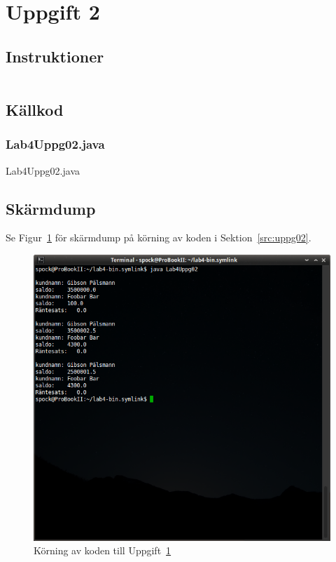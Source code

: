 \section{Uppgift 2}\label{sec:uppg02}

\subsection{Instruktioner}
\begin{Verbatim}[fontsize=\small]
% TODO: Lägg till instruktioner
\end{Verbatim}


\subsection{Källkod}
\subsubsection{Lab4Uppg02.java}
\caption{Lab4Uppg02.java}
\label{src:uppg02}

\subsection{Skärmdump}
Se Figur~\ref{fig:uppg02-screenshot} för skärmdump på körning av koden i
Sektion~\ref{src:uppg02}.

\begin{figure}[htbp]
\centering
\includegraphics[width=\linewidth]{img/02.png}
\caption{Körning av koden till Uppgift~\ref{sec:uppg02}}
\label{fig:uppg02-screenshot}
\end{figure}

